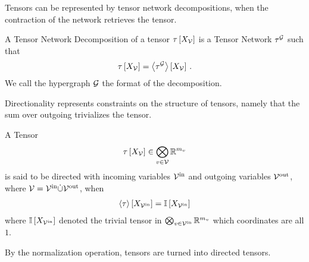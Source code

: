 
Tensors can be represented by tensor network decompositions, when the contraction of the network retrieves the tensor.

\begin{definition}\label{def:tnDecomposition}
	A Tensor Network Decomposition of a tensor $\tau\left[X_{\mathcal{V}}\right]$ is a Tensor Network $\tau^{\mathcal{G}}$ such that
		\[ \tau\left[X_{\mathcal{V}}\right]= \left\langle \tau^{\mathcal{G}}\right\rangle \left[ X_{\mathcal{V}} \right] \, . \]
	We call the hypergraph $\mathcal{G}$ the format of the decomposition.
\end{definition}






Directionality represents constraints on the structure of tensors, namely that the sum over outgoing trivializes the tensor.

\begin{definition}\label{def:directedTensor}
	A Tensor
	\begin{align*}
		\tau\left[X_{\mathcal{V}}\right] \in\bigotimes_{v\in\mathcal{V}}\mathbb{R}^{m_{v}} 
	\end{align*}
	is said to be directed with incoming variables $\mathcal{V}^{\mathrm{in}}$ and outgoing variables $\mathcal{V}^{\mathrm{out}}$, where $\mathcal{V}=\mathcal{V}^{\mathrm{in}}\dot{\cup}\mathcal{V}^{\mathrm{out}}$, when
	\begin{align*}
		\left\langle \tau\right\rangle \left[ X_{\mathcal{V}^{\mathrm{in}}} \right] =  \mathbb{I}\left[X_{\mathcal{V}^{\mathrm{in}}}\right]
	\end{align*}
	where $\mathbb{I}\left[X_{\mathcal{V}^{\mathrm{in}}}\right]$ denoted the trivial tensor in  $\bigotimes_{v\in\mathcal{V}^{\mathrm{in}}}\mathbb{R}^{m_{v}}$ which coordinates are all $1$.
\end{definition}

By the normalization operation, tensors are turned into directed tensors.

